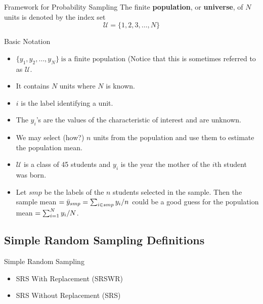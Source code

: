 \documentclass[10pt]{beamer}\usepackage[]{graphicx}\usepackage[]{xcolor}
\begin{document}
\begin{frame}{Framework for Probability Sampling}
The finite \textbf{population}, or \textbf{universe}, of $N$ units is denoted by the index set $$\mathcal{U}=\{1,2,3,\dots,N\}$$
\end{frame}

\begin{frame}{Basic Notation}

\begin{itemize}
\item $\{ y_1,y_2,\dots,y_N\}\;\textrm{is a finite population}$ (Notice that this is sometimes referred to as $\mathcal{U}$.
\item It contains $N$ units where $N$ is known.
\item $i$ is the label identifying a unit.
\item The $y_i$'s are the values of the characteristic of interest and are unknown.
\item We may select (how?) $n$ units from the population and use them to
estimate the population mean.
\item $\mathcal{U}$ is a class of 45 students and $y_i$ is the year the mother 
of the $i$th student was born.
\item Let $smp$ be the labels of the $n$ students selected in the sample. Then
the sample mean $= \bar{y}_{smp} = \sum_{i \in smp} y_i/n$  could be a  good guess for the population mean $=\sum_{i=1}^N y_i/N$.
\end{itemize}
\end{frame}


\subsection{Simple Random Sampling Definitions}

\begin{frame}{Simple Random Sampling}

\begin{itemize}
\item SRS With Replacement (SRSWR)
\item SRS Without Replacement (SRS)
\end{itemize}

\end{frame}
\end{document}
